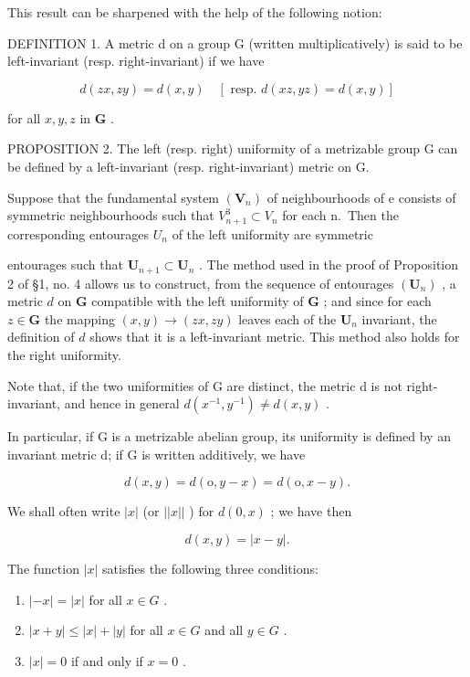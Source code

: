 This result can be sharpened with the help of the following notion:

DEFINITION 1. A metric d on a group G (written multiplicatively) is said to be left-invariant (resp. right-invariant) if we have

\[
d (z x, z y) = d (x, y) \quad [ \text { resp. } d (x z, y z) = d (x, y) ]
\]

for all \(x, y, z\) in \(\mathbf{G}\) .

PROPOSITION 2. The left (resp. right) uniformity of a metrizable group G can be defined by a left-invariant (resp. right-invariant) metric on G.

Suppose that the fundamental system \((\mathbf{V}_{n})\) of neighbourhoods of e consists of symmetric neighbourhoods such that \(V_{n+1}^{3} \subset V_{n}\) for each n.~Then the corresponding entourages \(U_{n}\) of the left uniformity are symmetric

entourages such that \(\mathbf{U}_{n+1} \subset \mathbf{U}_n\) . The method used in the proof of Proposition 2 of §1, no. 4 allows us to construct, from the sequence of entourages \((\mathbf{U}_n)\) , a metric \(d\) on \(\mathbf{G}\) compatible with the left uniformity of \(\mathbf{G}\) ; and since for each \(z \in \mathbf{G}\) the mapping \((x, y) \to (zx, zy)\) leaves each of the \(\mathbf{U}_n\) invariant, the definition of \(d\) shows that it is a left-invariant metric. This method also holds for the right uniformity.

Note that, if the two uniformities of G are distinct, the metric d is not right-invariant, and hence in general \(d(x^{-1}, y^{-1}) \neq d(x, y)\) .

In particular, if G is a metrizable abelian group, its uniformity is defined by an invariant metric d; if G is written additively, we have

\[
d (x, y) = d (\mathrm{o}, y - x) = d (\mathrm{o}, x - y).
\]

We shall often write \(|x|\) (or \(||x||\) ) for \(d(0, x)\) ; we have then

\[
d (x, y) = | x - y |.
\]

The function \(|x|\) satisfies the following three conditions:

\begin{enumerate}
\def\labelenumi{\alph{enumi})}
\item
  \(|-x| = |x|\) for all \(x \in G\) .
\item
  \(|x + y| \leqslant |x| + |y|\) for all \(x \in G\) and all \(y \in G\) .
\item
  \(|x| = 0\) if and only if \(x = 0\) .
\end{enumerate}

